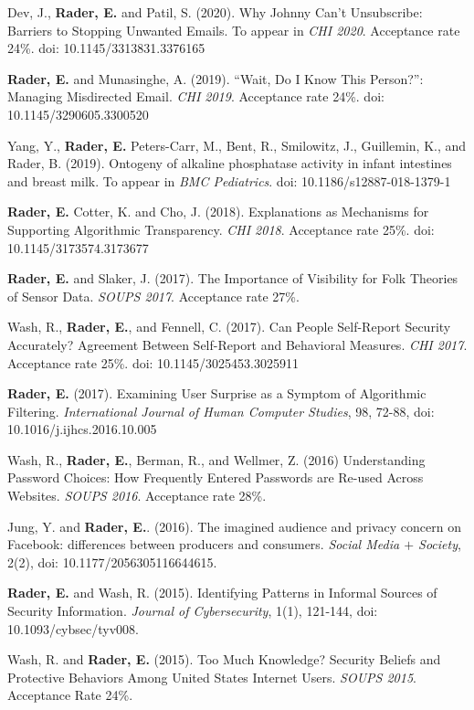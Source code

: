 \documentclass[9pt]{extarticle}
\begin{document}
Dev, J., \textbf{Rader, E.} and Patil, S. (2020). Why Johnny Can't Unsubscribe: Barriers to Stopping Unwanted Emails. To appear in \emph{CHI 2020}. Acceptance rate 24\%. doi: 10.1145/3313831.3376165

\textbf{Rader, E.} and Munasinghe, A. (2019). ``Wait, Do I Know This Person?'': Managing Misdirected Email.  \emph{CHI 2019}. Acceptance rate 24\%. doi: 10.1145/3290605.3300520

Yang, Y., \textbf{Rader, E.} Peters-Carr, M., Bent, R., Smilowitz, J., Guillemin, K., and Rader, B. (2019). Ontogeny of alkaline phosphatase activity in infant intestines and breast milk. To appear in \emph{BMC Pediatrics}. doi: 10.1186/s12887-018-1379-1

\textbf{Rader, E.} Cotter, K. and Cho, J. (2018). Explanations as Mechanisms for Supporting Algorithmic Transparency.  \emph{CHI 2018}. Acceptance rate 25\%. doi: 10.1145/3173574.3173677

\textbf{Rader, E.} and Slaker, J. (2017). The Importance of Visibility for Folk Theories of Sensor Data. \emph{SOUPS 2017}. Acceptance rate 27\%. 

Wash, R., \textbf{Rader, E.}, and Fennell, C. (2017). Can People Self-Report Security Accurately? Agreement Between Self-Report and Behavioral Measures. \emph{CHI 2017}. Acceptance rate 25\%. doi: 10.1145/3025453.3025911

\textbf{Rader, E.} (2017). Examining User Surprise as a Symptom of Algorithmic Filtering. \emph{International Journal of Human Computer Studies}, 98, 72-88, doi: 10.1016/j.ijhcs.2016.10.005

Wash, R., \textbf{Rader, E.}, Berman, R., and Wellmer, Z. (2016) Understanding Password Choices: How Frequently Entered Passwords are Re-used Across Websites. \emph{SOUPS 2016}. Acceptance rate 28\%.

Jung, Y. and \textbf{Rader, E.}. (2016). The imagined audience and privacy concern on Facebook: differences between producers and consumers. \emph{Social Media $+$ Society}, 2(2), doi: 10.1177/2056305116644615.

\textbf{Rader, E.} and Wash, R. (2015). Identifying Patterns in Informal Sources of Security Information. \emph{Journal of Cybersecurity}, 1(1), 121-144, doi: 10.1093/cybsec/tyv008.

Wash, R. and \textbf{Rader, E.} (2015). Too Much Knowledge? Security Beliefs and Protective Behaviors Among United States Internet Users. \emph{SOUPS 2015}. Acceptance Rate 24\%.
\end{document}
